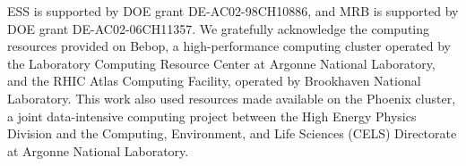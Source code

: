 \documentclass[twocolappendix, appendixfloats, numberedappendix, twocolumn, apj]{openjournal}
\begin{document}
ESS is supported by DOE grant DE-AC02-98CH10886, and MRB is supported by DOE
grant DE-AC02-06CH11357.  We gratefully acknowledge the computing resources
provided on Bebop, a high-performance computing cluster operated by the
Laboratory Computing Resource Center at Argonne National Laboratory, and the
RHIC Atlas Computing Facility, operated by Brookhaven National Laboratory.
This work also used resources made available on the Phoenix cluster, a joint
data-intensive computing project between the High Energy Physics Division and
the Computing, Environment, and Life Sciences (CELS) Directorate at Argonne
National Laboratory.




\end{document}

